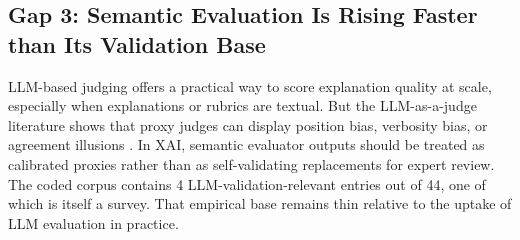 \documentclass[twoside,11pt]{article}
\begin{document}
\subsection{Gap 3: Semantic Evaluation Is Rising Faster than Its Validation Base}

LLM-based judging offers a practical way to score explanation quality at
scale, especially when explanations or rubrics are textual. But the
LLM-as-a-judge literature shows that proxy judges can display position
bias, verbosity bias, or agreement illusions
\citep{zheng2023judging,gu2024llmjudge}. In XAI, semantic evaluator
outputs should be treated as calibrated proxies rather than as
self-validating replacements for expert review. The coded corpus contains
4 LLM-validation-relevant entries out of 44, one of which is itself a survey.
That empirical base remains thin relative to the uptake of LLM evaluation
in practice.
\end{document}
